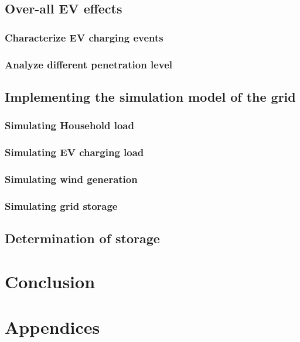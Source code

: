 \documentclass[12pt,a4paper]{report}
\begin{document}
            \section{Over-all EV effects}
                \subsection{Characterize EV charging events}
                \subsection{Analyze different penetration level}
            
            \section{Implementing the simulation model of the grid}
                \subsection{Simulating Household load}
                \subsection{Simulating EV charging load}
                \subsection{Simulating wind generation}
                \subsection{Simulating grid storage}
            \section{Determination of storage}

    \chapter{Conclusion}
    \chapter*{Appendices}
    \cleardoublepage  
    
    
\end{document}
